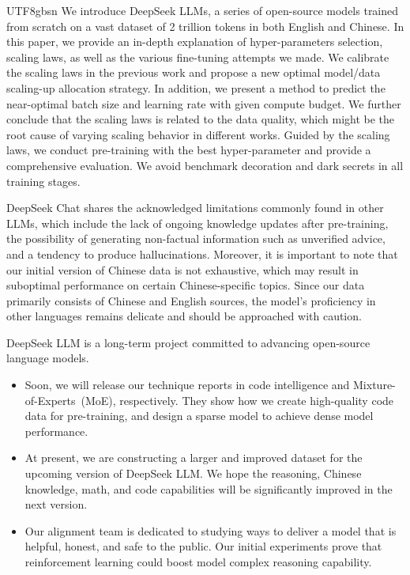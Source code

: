 \documentclass[11pt, a4paper, logo, copyright, nonumbering]{deepseek}
\begin{document}
\begin{CJK*}{UTF8}{gbsn}
We introduce DeepSeek LLMs, a series of open-source models trained from scratch on a vast dataset of 2 trillion tokens in both English and Chinese.  In this paper, we provide an in-depth explanation of hyper-parameters selection, scaling laws, as well as the various fine-tuning attempts we made. We calibrate the scaling laws in the previous work and propose a new optimal model/data scaling-up allocation strategy. In addition, we 
 present a method to predict the near-optimal batch size and learning rate with given compute budget. We further conclude that the scaling laws is related to the data quality, which might be the root cause of varying scaling behavior in different works. Guided by the scaling laws, we conduct pre-training with the best hyper-parameter and provide a comprehensive evaluation. We avoid benchmark decoration and dark secrets in all training stages.

DeepSeek Chat shares the acknowledged limitations commonly found in other LLMs, which include the lack of ongoing knowledge updates after pre-training, the possibility of generating non-factual information such as unverified advice, and a tendency to produce hallucinations. Moreover, it is important to note that our initial version of Chinese data is not exhaustive, which may result in suboptimal performance on certain Chinese-specific topics. Since our data primarily consists of Chinese and English sources, the model's proficiency in other languages remains delicate and should be approached with caution. 

DeepSeek LLM is a long-term project committed to advancing open-source language models.

\begin{itemize}
    \item 
    Soon, we will release our technique reports in code intelligence and  Mixture-of-Experts~(MoE), respectively. They show how we create high-quality code data for pre-training, and design a sparse model to achieve dense model performance. 
    \item At present, we are constructing a larger and improved dataset for the upcoming version of DeepSeek LLM. We hope the reasoning, Chinese knowledge, math, and code capabilities will be significantly improved in the next version.  
    \item Our alignment team is dedicated to studying ways to deliver a model that is helpful, honest, and safe to the public. Our initial experiments prove that reinforcement learning could boost model complex reasoning capability.
    

\end{itemize}
\end{CJK*}
\end{document}
